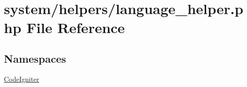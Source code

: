 \hypertarget{language__helper_8php}{}\section{system/helpers/language\+\_\+helper.php File Reference}
\label{language__helper_8php}
\subsection*{Namespaces}
\begin{DoxyCompactItemize}
\item 
 \mbox{\hyperlink{namespace_code_igniter}{Code\+Igniter}}
\end{DoxyCompactItemize}

